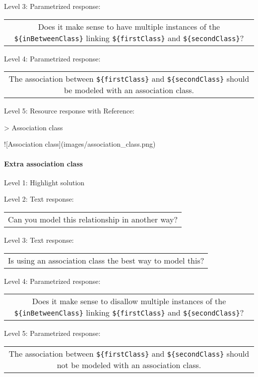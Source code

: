 \noindent Level 3: Parametrized response: \medskip

\begin{tabular}{|c}
Does it make sense to have multiple instances of the \verb|${inBetweenClass}| linking \verb|${firstClass}| and \verb|${secondClass}|?
\end{tabular} \medskip

\noindent Level 4: Parametrized response: \medskip

\begin{tabular}{|c}
The association between \verb|${firstClass}| and \verb|${secondClass}| should be modeled with an association class.
\end{tabular} \medskip

\noindent Level 5: Resource response with Reference:

> Association class

![Association class](images/association_class.png)


\paragraph{Extra association class}

\noindent Level 1: Highlight solution \medskip

\noindent Level 2: Text response: \medskip

\begin{tabular}{|c}
Can you model this relationship in another way?
\end{tabular} \medskip

\noindent Level 3: Text response: \medskip

\begin{tabular}{|c}
Is using an association class the best way to model this?
\end{tabular} \medskip

\noindent Level 4: Parametrized response: \medskip

\begin{tabular}{|c}
Does it make sense to disallow multiple instances of the \verb|${inBetweenClass}| linking \verb|${firstClass}| and \verb|${secondClass}|?
\end{tabular} \medskip

\noindent Level 5: Parametrized response: \medskip

\begin{tabular}{|c}
The association between \verb|${firstClass}| and \verb|${secondClass}| should not be modeled with an association class.
\end{tabular} \medskip


